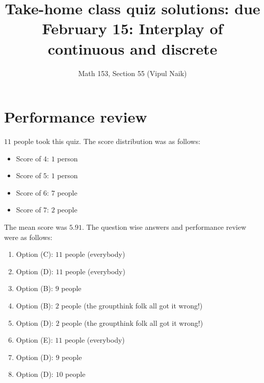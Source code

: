 \documentclass[10pt]{amsart}
\title{Take-home class quiz solutions: due February 15: Interplay of continuous and discrete}
\author{Math 153, Section 55 (Vipul Naik)}
\begin{document}
\maketitle

\section{Performance review}

$11$ people took this quiz. The score distribution was as follows:

\begin{itemize}
\item Score of $4$: $1$ person
\item Score of $5$: $1$ person
\item Score of $6$: $7$ people
\item Score of $7$: $2$ people
\end{itemize}

The mean score was $5.91$. The question wise answers and performance
review were as follows:

\begin{enumerate}
\item Option (C): $11$ people (everybody)
\item Option (D): $11$ people (everybody)
\item Option (B): $9$ people
\item Option (B): $2$ people (the groupthink folk all got it wrong!)
\item Option (D): $2$ people (the groupthink folk all got it wrong!)
\item Option (E): $11$ people (everybody)
\item Option (D): $9$ people
\item Option (D): $10$ people
\end{enumerate}
\end{document}
